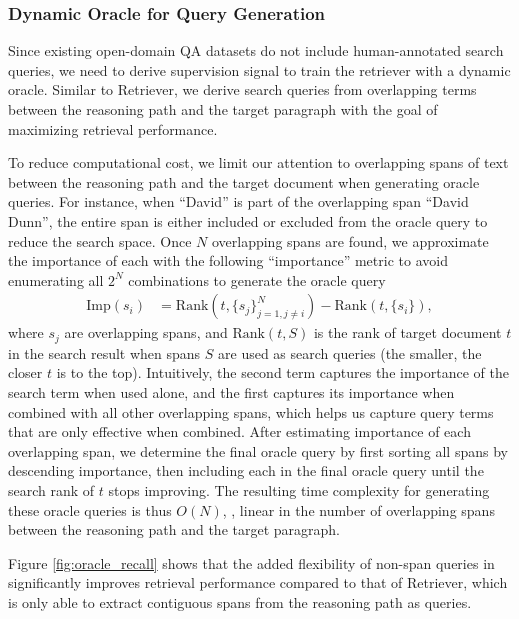 \subsubsection{Dynamic Oracle for Query Generation} \label{sec:query_oracle}

Since existing open-domain QA datasets do not include human-annotated search queries, we need to derive supervision signal to train the retriever with a dynamic oracle.
Similar to \golden{} Retriever, %
we derive search queries from overlapping terms between the reasoning path and the target paragraph with the goal of maximizing retrieval performance.

To reduce computational cost, we limit our attention to overlapping spans of text between the reasoning path and the target document when generating oracle queries.
For instance, when ``David'' is part of the overlapping span ``David Dunn'', the entire span is either included or excluded from the oracle query to reduce the search space.
Once $N$ overlapping spans are found, we approximate the importance of each with the following ``importance'' metric to avoid enumerating all $2^N$ combinations to generate the oracle query
\begin{align}
    \mathrm{Imp}(s_i) &= \mathrm{Rank}(t, \{s_j\}_{j=1, j\ne i}^N) - \mathrm{Rank}(t, \{s_i\}), \nonumber
\end{align}
where $s_j$ are overlapping spans, and $\mathrm{Rank}(t, S)$ is the rank of target document $t$ in the search result when spans $S$ are used as search queries (the smaller, the closer $t$ is to the top).
Intuitively, the second term captures the importance of the search term when used alone, and the first captures its importance when combined with all other overlapping spans, which helps us capture query terms that are only effective when combined.
After estimating importance of each overlapping span, we determine the final oracle query by first sorting all spans by descending importance, then including each in the final oracle query until the search rank of $t$ stops improving. 
The resulting time complexity for generating these oracle queries is thus $O(N)$, \ie, linear in the number of overlapping spans between the reasoning path and the target paragraph.

Figure \ref{fig:oracle_recall} shows that the added flexibility of non-span queries in \irrr{} significantly improves retrieval performance compared to that of \golden{} Retriever, which is only able to extract contiguous spans from the reasoning path as queries.

